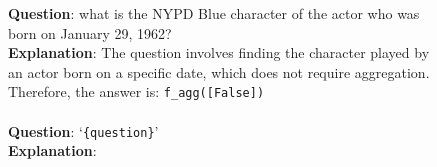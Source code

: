 \begin{figure}[htb]
\begin{tcolorbox}
\textbf{Question}: what is the NYPD Blue character of the actor who was born on January 29, 1962? \\
\textbf{Explanation}: The question involves finding the character played by an actor born on a specific date, which does not require aggregation. Therefore, the answer is: \texttt{f\_agg([False])} \\
 \\
\textbf{Question}: `{\texttt{\{question\}}}' \\
\textbf{Explanation}: 

\end{tcolorbox}
\label{fig:agg_detection}
\end{figure}









\newpage
\newpage


